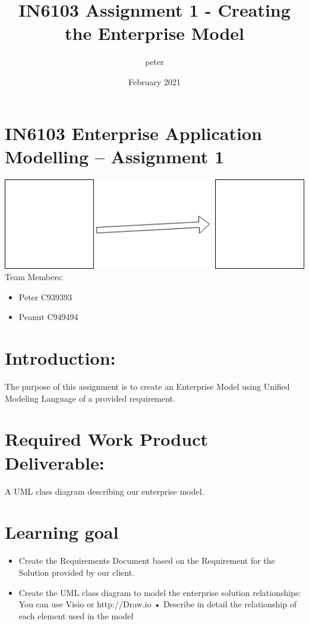 \documentclass{article}
\title{IN6103 Assignment 1 - Creating the Enterprise Model}
\author{peter }
\date{February 2021}
\begin{document}
\maketitle

\section{IN6103 Enterprise Application Modelling – Assignment 1}
\includegraphics[]{sampleofdrawio.png}
Team Members:
\begin{itemize}
    \item Peter C939393
    \item Peanut C949494
\end{itemize}

\section{Introduction:}
The purpose of this assignment is to create an Enterprise Model using Unified Modeling Language of a provided requirement.

\section{Required Work Product Deliverable:}

A UML class diagram describing our enterprise model. 

\section{Learning goal}
\begin{itemize}
    \item Create the Requirements Document based on the Requirement for the Solution provided by our client.
    \item Create the UML class diagram to model the enterprise solution relationships: You can use Visio or http://Draw.io
• Describe in detail the relationship of each element used in the model
\end{itemize}



\end{document}
